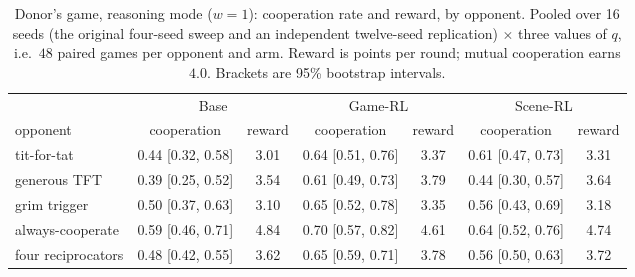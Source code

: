 \begin{table}[t]
\centering\small
\caption{Donor's game, reasoning mode ($w=1$): cooperation rate and reward, by opponent. Pooled over 16 seeds (the original four-seed sweep and an independent twelve-seed replication) $\times$ three values of $q$, i.e.\ $48$ paired games per opponent and arm. Reward is points per round; mutual cooperation earns $4.0$. Brackets are 95\% bootstrap intervals.}
\label{tab:donors-think}
\begin{tabular}{@{}l cc cc cc@{}}
\toprule
& \multicolumn{2}{c}{Base} & \multicolumn{2}{c}{Game-RL} & \multicolumn{2}{c}{Scene-RL} \\
\cmidrule(lr){2-3}\cmidrule(lr){4-5}\cmidrule(lr){6-7}
opponent & cooperation & reward & cooperation & reward & cooperation & reward \\
\midrule
tit-for-tat & 0.44 [0.32, 0.58] & 3.01 & 0.64 [0.51, 0.76] & 3.37 & 0.61 [0.47, 0.73] & 3.31 \\
generous TFT & 0.39 [0.25, 0.52] & 3.54 & 0.61 [0.49, 0.73] & 3.79 & 0.44 [0.30, 0.57] & 3.64 \\
grim trigger & 0.50 [0.37, 0.63] & 3.10 & 0.65 [0.52, 0.78] & 3.35 & 0.56 [0.43, 0.69] & 3.18 \\
always-cooperate & 0.59 [0.46, 0.71] & 4.84 & 0.70 [0.57, 0.82] & 4.61 & 0.64 [0.52, 0.76] & 4.74 \\
\midrule four reciprocators & 0.48 [0.42, 0.55] & 3.62 & 0.65 [0.59, 0.71] & 3.78 & 0.56 [0.50, 0.63] & 3.72 \\
\bottomrule
\end{tabular}
\end{table}

